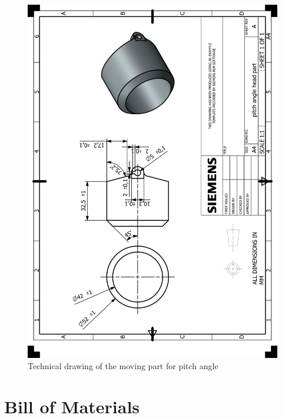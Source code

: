\documentclass[12pt]{article}
\begin{document}
\begin{appendices}
\begin{figure}[H]
    \centering
    \includegraphics[width=\textwidth]{HP_pitch angle head part.png} 
    \caption{Technical drawing of the moving part for pitch angle}
    \label{fig:technical-drawing}
\end{figure}

\newpage





\section{Bill of Materials}


\end{appendices}
\end{document}

